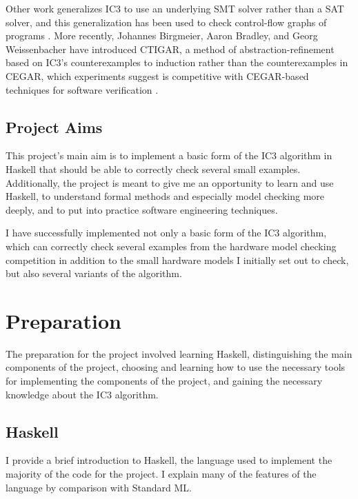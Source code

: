 \documentclass[12pt,a4paper,twoside,openright]{report}
\begin{document}
Other work generalizes IC3 to use an underlying SMT solver rather than a
SAT solver, and this generalization has been used to check control-flow
graphs of programs \cite{cimatti12}.
More recently, Johannes Birgmeier, Aaron Bradley, and Georg Weissenbacher
have introduced CTIGAR, a method of abstraction-refinement based on IC3's
counterexamples to induction rather than the counterexamples in CEGAR,
which experiments suggest is competitive with CEGAR-based techniques for
software verification \cite{birgmeier14}.

\section{Project Aims}

This project's main aim is to implement a basic form of the IC3 algorithm in
Haskell that should be able to correctly check several
small examples. Additionally, the project is meant to give me an opportunity
to learn and use Haskell, to understand formal methods and especially model
checking more deeply, and to put into practice software engineering techniques.

I have successfully implemented not only a basic form of the IC3 algorithm,
which can correctly check several examples from the hardware model checking
competition in addition to the small hardware models I initially set out
to check, but also several variants of the algorithm.

\chapter{Preparation}

The preparation for the project involved learning Haskell, distinguishing
the main components of the project, choosing and learning how to use
the necessary tools for implementing the components of the project,
and gaining the necessary knowledge about the IC3 algorithm.

\section{Haskell}

I provide a brief introduction to Haskell, the language used to implement the
majority of the code for the project. I explain many of the features of the
language by comparison with Standard ML.

\end{document}
